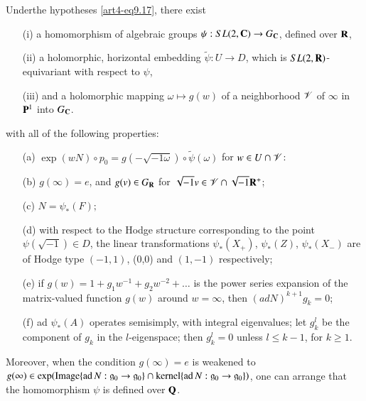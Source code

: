 \begin{theorem}\label{art4-thm9.19} 
Under\pageoriginale the hypotheses \eqref{art4-eq9.17}, there exist
\begin{itemize}
\item[{\rm (i)}] a homomorphism of algebraic groups $\psi: SL (2, \mathbf{C}) \to G_{\mathbf{C}}$, defined over $\mathbf{R}$,

\item[{\rm (ii)}] a holomorphic, horizontal embedding $\tilde{\psi}: U \to D$, which is $SL (2,\mathbf{R})$-equivariant with respect to $\psi$,

\item[{\rm (iii)}] and a holomorphic mapping $\omega \longmapsto g(w)$ of a neighborhood $\mathscr{V}$ of $\infty$ in $\mathbf{P}^1$ into $G_{\mathbf{C}}$.
\end{itemize}
with all of the following properties:
\begin{itemize}
\item[{\rm (a)}] $\exp(w N) \circ p_0 = g (- \sqrt{-1\omega}) \circ \tilde{\psi} (\omega)$ for $w \in U \cap \mathscr{V}$:

\item[{\rm (b)}] $g (\infty) = e$, and $g (v) \in G_{\mathbf{R}}$ for $\sqrt{-1} v \in \mathscr{V} \cap \sqrt{-1} \mathbf{R}^+$;

\item[{\rm (c)}] $N = \psi_\ast (F);$

\item[{\rm (d)}] with respect to the Hodge structure corresponding to the point $\psi (\sqrt{-1}) \in D$, the linear transformations $\psi_\ast(X_+)$, $\psi_\ast (Z)$, $\psi_\ast(X_-)$ are of Hodge type $(-1,1)$, (0,0) and $(1, -1)$ respectively;

\item[{\rm (e)}] if $g (w) = 1 + g_1 w^{-1} + g_2 w^{-2} + \ldots$ is the power series expansion of the matrix-valued function $g(w)$ around $w = \infty$, then $(ad N)^{k+1} g_k = 0$;

\item[{\rm (f)}] ad $\psi_\ast (A)$ operates semisimply, with integral eigenvalues; let $g^l_k$ be the component of $g_k$ in the $l$-eigenspace; then $g^l_k =0$ unless $l \leq k - 1$, for $k \geqslant 1$.
\end{itemize}

Moreover, when the condition $g(\infty) = e$ is weakened to $g(\infty) \in \exp (\operatorname{Image} \{\operatorname{ad} N : \mathfrak{g}_0 \to \mathfrak{g}_0\} \cap \operatorname{kernel} \{\operatorname{ad} N: \mathfrak{g}_0 \to \mathfrak{g}_0\})$, one can arrange that the homomorphism $\psi$ is defined over $\mathbf{Q}$.
\end{theorem}

